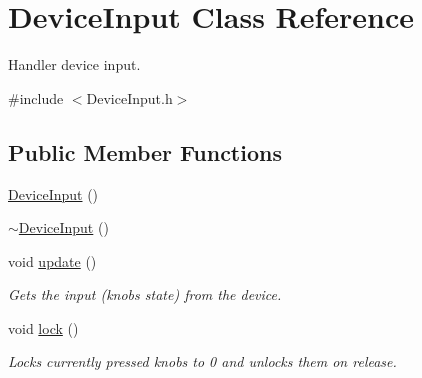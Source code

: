 \hypertarget{classDeviceInput}{}\section{Device\+Input Class Reference}
\label{classDeviceInput}


Handler device input.  




{\ttfamily \#include $<$Device\+Input.\+h$>$}

\subsection*{Public Member Functions}
\begin{DoxyCompactItemize}
\item 
\mbox{\hyperlink{classDeviceInput_a5a5d144c0a4a2d0fedfd85fcb687a716}{Device\+Input}} ()
\item 
\mbox{\hyperlink{classDeviceInput_a6c06d020cca58b3d4763e1717382b1a8}{$\sim$\+Device\+Input}} ()
\item 
\mbox{\label{classDeviceInput_ae6af261f4e6fa656dad4bd4a1efddbc6}} 
void \mbox{\hyperlink{classDeviceInput_ae6af261f4e6fa656dad4bd4a1efddbc6}{update}} ()
\begin{DoxyCompactList}\small\item\em Gets the input (knobs state) from the device. \end{DoxyCompactList}\item 
\mbox{\label{classDeviceInput_ab245e46a2e95790d5cfd5589e6099cc8}} 
void \mbox{\hyperlink{classDeviceInput_ab245e46a2e95790d5cfd5589e6099cc8}{lock}} ()
\begin{DoxyCompactList}\small\item\em Locks currently pressed knobs to 0 and unlocks them on release. \end{DoxyCompactList}\end{DoxyCompactItemize}

